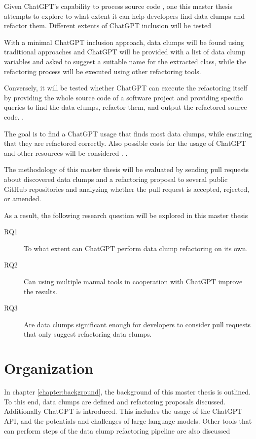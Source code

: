 Given ChatGPT's capability to process  source code \cite{sadik2023analysis}\cite{guo2023exploring}, one this master thesis attempts to explore to what extent it can help developers find data clumps and refactor them. Different extents of ChatGPT inclusion will be tested  

With a minimal ChatGPT inclusion approach,  data clumps will be found using traditional approaches and ChatGPT will be provided with a list of data clump variables and asked to suggest a suitable name for the extracted class, while the refactoring process will be executed using other refactoring tools.


Conversely, it will be tested whether ChatGPT can execute the refactoring itself by providing the whole source code of a software project and providing specific queries to find the data clumps, refactor them, and output the refactored source code. \cite{White2023ChatGPTPP}.


The goal is to find a ChatGPT usage that finds most data clumps, while ensuring that they are refactored correctly. Also possible costs for the usage of ChatGPT and other resources will be considered \cite{xia2023conversation}. \cite{4ef0b456377aafb68884e643779dffb36b8e7cc1}.


The methodology of this master thesis will be evaluated by sending  pull requests about discovered data clumps and a refactoring proposal to several public GitHub repositories and analyzing whether the pull request is accepted, rejected, or amended.   

As a result, the following research question will be explored in this master thesis

\begin{description}
    \item [RQ1] To what extent can ChatGPT perform data clump refactoring on its own.
    \item [RQ2] Can using multiple manual tools in cooperation with ChatGPT improve the results.
    \item [RQ3] Are data clumps significant enough for developers to consider pull requests that only suggest refactoring data clumps. 
\end{description}

\section{Organization}

In chapter \ref{chapter:background}, the background of this master thesis  is outlined. To this end, data clumps are defined and refactoring proposals discussed. Additionally ChatGPT is introduced. This includes the usage of the ChatGPT \ac{API}, and the potentials and challenges of large language models. Other tools that can perform  steps of the data clump refactoring pipeline are also discussed 

